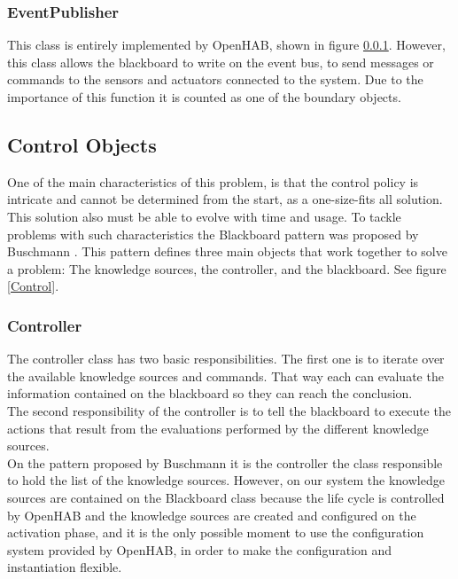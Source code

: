 \subsubsection{EventPublisher}
\label{EventPublisher}

This class is entirely implemented by OpenHAB, shown in figure \ref{EventPublisher}. However, this class allows the blackboard to write on the event bus, to send messages or commands to the sensors and actuators connected to the system. Due to the importance of this function it is counted as one of the boundary objects.

\subsection{Control Objects}

One of the main characteristics of this problem, is that the control policy is intricate and cannot be determined from the start, as a one-size-fits all solution. This solution also must be able to evolve with time and usage. To tackle problems with such characteristics the Blackboard pattern was proposed by Buschmann \etAl\cite{Buschmann:1996:PSA:249013}. This pattern defines three main objects that work together to solve a problem: The knowledge sources, the controller, and the blackboard. See figure \ref{Control}.

\subsubsection{Controller}
\label{Controller}
The controller class has two  basic responsibilities. The first one is to iterate over the available knowledge sources and commands. That way each can evaluate the information contained on the blackboard so they can reach the conclusion.\\
The second responsibility of the controller is to tell the blackboard to execute the actions that result from the evaluations performed by the different knowledge sources.\\
On the pattern proposed by Buschmann \etAl\cite{Buschmann:1996:PSA:249013} it is the controller the class responsible to hold the list of the knowledge sources. However, on our system the knowledge sources are contained on the Blackboard class because the life cycle is controlled by OpenHAB and the knowledge sources are created and configured on the activation phase, and it is the only possible moment to use the configuration system provided by OpenHAB, in order to make the configuration and instantiation flexible.

